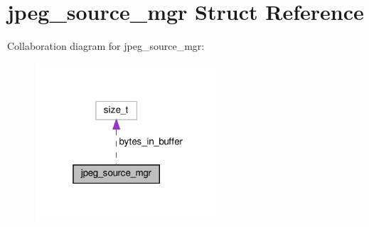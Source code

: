 \hypertarget{structjpeg__source__mgr}{}\section{jpeg\+\_\+source\+\_\+mgr Struct Reference}
\label{structjpeg__source__mgr}


Collaboration diagram for jpeg\+\_\+source\+\_\+mgr\+:
\nopagebreak
\begin{figure}[H]
\begin{center}
\leavevmode
\includegraphics[width=196pt]{structjpeg__source__mgr__coll__graph}
\end{center}
\end{figure}
